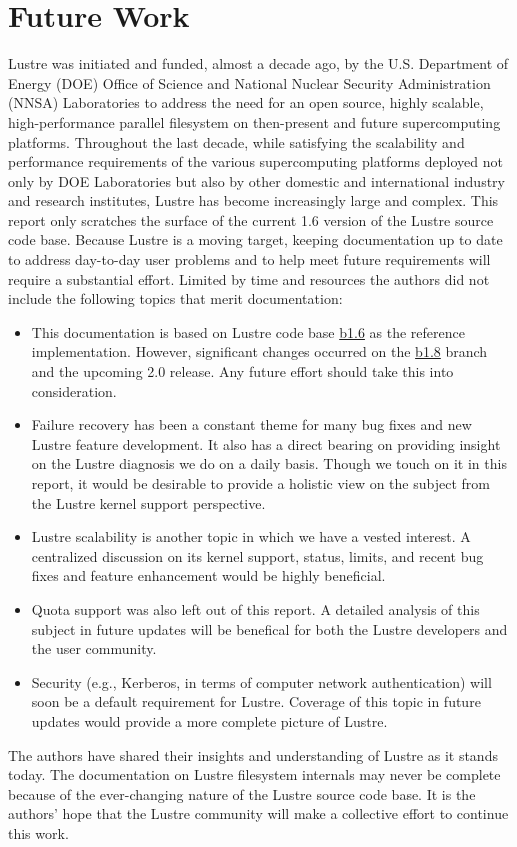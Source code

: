 \section{Future Work}

Lustre was initiated and funded, almost a decade ago, by the U.S. Department of
Energy (DOE) Office of Science and National Nuclear Security Administration
(NNSA) Laboratories to address the need for an open source, highly scalable,
high-performance parallel filesystem on then-present and future supercomputing
platforms. Throughout the last decade, while satisfying the scalability and
performance requirements of the various supercomputing platforms deployed not
only by DOE Laboratories but also by other domestic and international industry
and research institutes, Lustre has become increasingly large and complex.
This report only scratches the surface of the current 1.6 version of the Lustre
source code base. Because Lustre is a moving target, keeping documentation up
to date to address day-to-day user problems and to help meet future
requirements will require a substantial effort. Limited by time and resources
the authors did not include the following topics that merit documentation: 


\begin{itemize}

\item This documentation is based on Lustre code base \url{b1.6} as the
reference implementation. However, significant changes occurred on the \url{b1.8}
branch and the upcoming 2.0 release. Any future effort should take this into
consideration.

\item Failure recovery has been a constant theme for many bug fixes and new
Lustre feature development. It also has a direct bearing on providing insight on the 
Lustre diagnosis we do on a daily basis. Though we touch on it in
this report, it would be desirable to provide a holistic view on the subject
from the Lustre kernel support perspective.


\item Lustre scalability is another topic in which we have a vested interest.
A centralized discussion on its kernel support, status, limits, and recent bug
fixes and feature enhancement would be highly beneficial.

\item Quota support was also left out of this report. A detailed analysis of
this subject in future updates will be benefical for both the Lustre developers
and the user community.

\item Security (e.g., Kerberos, in terms of computer network authentication)
will soon be a default requirement for Lustre. Coverage of this topic in future
updates would provide  a more complete picture of Lustre. 

\end{itemize}

The authors have shared their insights and understanding of Lustre as it stands
today. The documentation on Lustre filesystem internals may never be complete
because of the ever-changing nature of the Lustre source code base. It is the
authors' hope that the Lustre community will make a collective effort to
continue this work.
